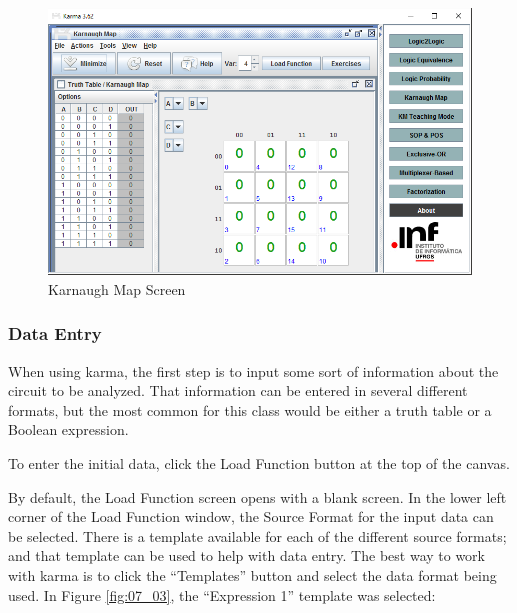 \begin{figure}[H]
	\centering
	\includegraphics[width=\maxwidth{.95\linewidth}]{gfx/07_02}
	\caption{Karnaugh Map Screen}
	\label{fig:07_02}
\end{figure}

\subsubsection{Data Entry} When using \gls{karma}, the first step is to input some sort of information about the circuit to be analyzed. That information can be entered in several different formats, but the most common for this class would be either a truth table or a Boolean expression.

To enter the initial data, click the Load Function button at the top of the canvas.

By default, the Load Function screen opens with a blank screen. In the lower left corner of the Load Function window, the Source Format for the input data can be selected. There is a template available for each of the different source formats; and that template can be used to help with data entry. The best way to work with \gls{karma} is to click the ``Templates'' button and select the data format being used. In Figure \ref{fig:07_03}, the ``Expression 1'' template was selected:

